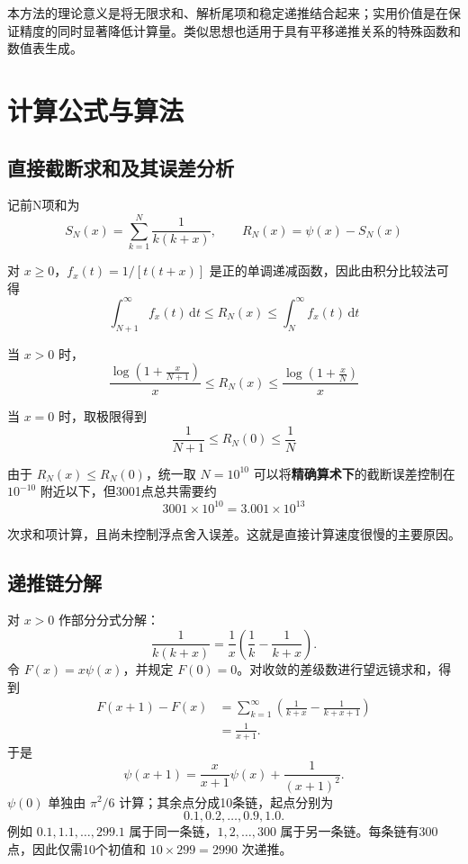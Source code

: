\documentclass[UTF8,fontset=fandol,zihao=-4,a4paper]{ctexart}
\newcommand{\psif}{\psi}
\newcommand{\dd}{\mathrm{d}}
\begin{document}
本方法的理论意义是将无限求和、解析尾项和稳定递推结合起来；实用价值是在保证精度的同时显著降低计算量。类似思想也适用于具有平移递推关系的特殊函数和数值表生成。

\section{计算公式与算法}
\subsection{直接截断求和及其误差分析}
记前N项和为
\[
 S_N(x)=\sum_{k=1}^{N}\frac{1}{k(k+x)},\qquad
 R_N(x)=\psif(x)-S_N(x)
\]

对 $x\ge0$，$f_x(t)=1/[t(t+x)]$ 是正的单调递减函数，因此由积分比较法可得
\begin{equation}\label{eq:integralbound}
 \int_{N+1}^{\infty} f_x(t)\,\dd t
 \le R_N(x)\le
 \int_N^{\infty} f_x(t)\,\dd t
\end{equation}

当 $x>0$ 时，
\begin{equation}
 \frac{\log(1+\frac{x}{N+1})}{x}
 \le R_N(x)\le
 \frac{\log(1+\frac{x}{N})}{x}
\end{equation}

当 $x=0$ 时，取极限得到
\begin{equation}\label{eq:zerotail}
 \frac{1}{N+1}\le R_N(0)\le\frac{1}{N}
\end{equation}

由于 $R_N(x)\le R_N(0)$，统一取 $N=10^{10}$ 可以将\textbf{精确算术下}的截断误差控制在 $10^{-10}$ 附近以下，但3001点总共需要约
\[
 3001\times10^{10}=3.001\times10^{13}
\]

次求和项计算，且尚未控制浮点舍入误差。这就是直接计算速度很慢的主要原因。


\subsection{递推链分解}
对 $x>0$ 作部分分式分解：
\[
 \frac{1}{k(k+x)}=\frac{1}{x}\left(\frac1k-\frac1{k+x}\right).
\]
令 $F(x)=x\psif(x)$，并规定 $F(0)=0$。对收敛的差级数进行望远镜求和，得到
\begin{align*}
 F(x+1)-F(x)
 &=\sum_{k=1}^{\infty}\left(\frac1{k+x}-\frac1{k+x+1}\right)\\
 &=\frac1{x+1}.
\end{align*}
于是
\begin{equation}\label{eq:recurrence}
 \boxed{\psif(x+1)=\frac{x}{x+1}\psif(x)+\frac{1}{(x+1)^2}.}
\end{equation}
$\psif(0)$ 单独由 $\pi^2/6$ 计算；其余点分成10条链，起点分别为
\[
 0.1,0.2,\ldots,0.9,1.0.
\]
例如 $0.1,1.1,\ldots,299.1$ 属于同一条链，$1,2,\ldots,300$ 属于另一条链。每条链有300点，因此仅需10个初值和 $10\times299=2990$ 次递推。
\end{document}
